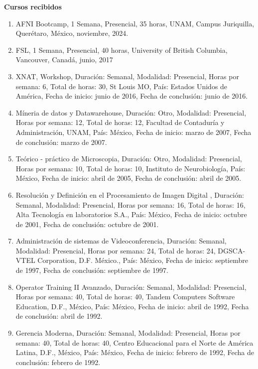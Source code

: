 \textbf{Cursos recibidos}

\begin{enumerate}

\item AFNI Bootcamp, 1 Semana, Presencial, 35 horas, UNAM, Campus 
Juriquilla, Querétaro, México, noviembre, 2024.

\item FSL, 1 Semana, Presencial, 40 horas, University of British 
Columbia, Vancouver, Canadá, junio, 2017

\item XNAT, Workshop, Duración: Semanal, Modalidad: Presencial, Horas por semana: 6, Total de horas: 30, St Louis MO, País: 
Estados Unidos de América, Fecha de inicio: junio de 2016, Fecha de 
conclusión: junio de 2016.

\item Míneria de datos y Datawarehouse, Duración: Otro, Modalidad: Presencial, Horas por semana: 12, Total de horas: 12, 
Facultad de Contaduría y Administración, UNAM, País: México, Fecha de inicio: marzo de 2007, Fecha de conclusión: marzo de 
2007.

\item Teórico - práctico de Microscopia, Duración: Otro, Modalidad: Presencial, Horas por semana: 10, Total de horas: 10, 
Instituto de Neurobiología, País: México, Fecha de inicio: abril de 2005, Fecha de conclusión: abril de 2005.

\item Resolución y Definición en el Procesamiento de Imagen Digital , Duración: Semanal, Modalidad: Presencial, Horas por 
semana: 16, Total de horas: 16, Alta Tecnología en laboratorios S.A., País: México, Fecha de inicio: octubre de 2001, Fecha 
de conclusión: octubre de 2001.

\item Administración de sistemas de Videoconferencia, Duración: Semanal, Modalidad: Presencial, Horas por semana: 24, Total 
de 
horas: 24, DGSCA-VTEL Corporation, D.F. México., País: México, Fecha de inicio: septiembre de 1997, Fecha de conclusión: 
septiembre de 1997.

\item Operator Training II Avanzado, Duración: Semanal, Modalidad: Presencial, Horas por semana: 40, Total de horas: 40, 
Tandem Computers Software Education, D.F., México, País: México, Fecha de inicio: abril de 1992, Fecha de conclusión: abril 
de 1992.

\item Gerencia Moderna, Duración: Semanal, Modalidad: Presencial, Horas por semana: 40, Total de horas: 40, Centro 
Educacional 
para el Norte de América Latina, D.F., México, País: México, Fecha de inicio: febrero de 1992, Fecha de conclusión: febrero 
de 1992.


\end{enumerate}
